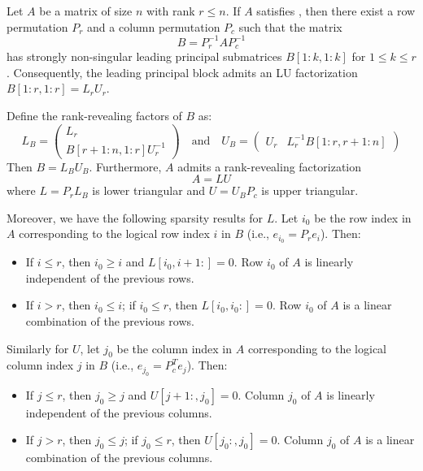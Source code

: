 \documentclass[10pt,twoside]{siamart1116}
\numberwithin{theorem}{section}
\begin{document}
\begin{theorem}\label{thm:main2}
	Let $A$ be a matrix of size $n$ with rank $r \le n$. If $A$ satisfies , then there exist a row permutation $P_r$ and a column permutation $P_c$ such that the matrix
	\[ B = P_r^{-1} A P_c^{-1} \]
	has strongly non-singular leading principal submatrices $B[1:k,1:k]$ for $1 \le k \le r$. Consequently, the leading principal block admits an LU factorization $B[1:r,1:r] = L_r U_r$.

	Define the rank-revealing factors of $B$ as:
	\[
		L_B = \begin{pmatrix} L_r \\ B[r+1:n, 1:r] U_r^{-1} \end{pmatrix}
		\quad \text{and} \quad
		U_B = \begin{pmatrix} U_r & L_r^{-1} B[1:r, r+1:n] \end{pmatrix}
	\]
	Then $B = L_B U_B$. Furthermore, $A$ admits a rank-revealing factorization
	\[ A = L U \]
	where $L = P_r L_B$ is lower triangular and $U = U_B P_c$ is upper triangular.

	Moreover, we have the following sparsity results for $L$. Let $i_0$ be the row index in $A$ corresponding to the logical row index $i$ in $B$ (i.e., $e_{i_0} = P_r e_i$). Then:
	\begin{itemize}
		\item If $i \le r$, then $i_0 \ge i$ and $L[i_0, i+1:] = 0$. Row $i_0$ of $A$ is linearly independent of the previous rows.
		\item If $i > r$, then $i_0 \le i$; if $i_0 \le r$, then $L[i_0,i_0:] = 0$. Row $i_0$ of $A$ is a linear combination of the previous rows.
	\end{itemize}
	Similarly for $U$, let $j_0$ be the column index in $A$ corresponding to the logical column index $j$ in $B$ (i.e., $e_{j_0} = P_c^T e_j$). Then:
	\begin{itemize}
		\item If $j \le r$, then $j_0 \ge j$ and $U[j+1:, j_0] = 0$. Column $j_0$ of $A$ is linearly independent of the previous columns.
		\item If $j > r$, then $j_0 \le j$; if $j_0 \le r$, then $U[j_0:, j_0] = 0$. Column $j_0$ of $A$ is a linear combination of the previous columns.
	\end{itemize}
\end{theorem}
\end{document}

